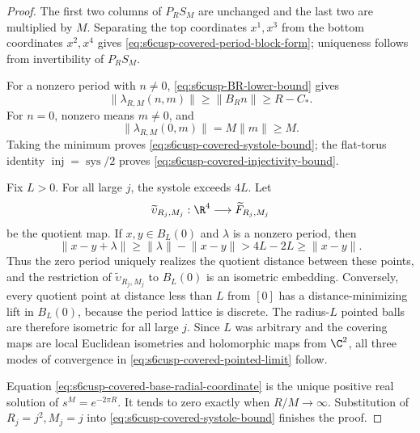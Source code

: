 \begin{proof}
The first two columns of \(P_RS_M\) are unchanged and the last two are
multiplied by \(M\).  Separating the top coordinates \(x^1,x^3\) from the
bottom coordinates \(x^2,x^4\) gives
\eqref{eq:s6cusp-covered-period-block-form}; uniqueness follows from
invertibility of \(P_RS_M\).

For a nonzero period with \(n\ne0\),
\eqref{eq:s6cusp-BR-lower-bound} gives
\[
 \lVert\lambda_{R,M}(n,m)\rVert
 \ge\lVert B_Rn\rVert
 \ge R-C_*.
\]
For \(n=0\), nonzero means \(m\ne0\), and
\[
 \lVert\lambda_{R,M}(0,m)\rVert=M\lVert m\rVert\ge M.
\]
Taking the minimum proves \eqref{eq:s6cusp-covered-systole-bound}; the
flat-torus identity
\(\operatorname{inj}=\operatorname{sys}/2\) proves
\eqref{eq:s6cusp-covered-injectivity-bound}.

Fix \(L>0\).  For all large \(j\), the systole exceeds \(4L\).  Let
\[
 \widetilde\upsilon_{R_j,M_j}:
 \R^4\longrightarrow\widetilde F_{R_j,M_j}
\]
be the quotient map.  If \(x,y\in B_L(0)\) and \(\lambda\) is a nonzero
period, then
\[
 \lVert x-y+\lambda\rVert
 \ge\lVert\lambda\rVert-\lVert x-y\rVert
 >4L-2L\ge\lVert x-y\rVert.
\]
Thus the zero period uniquely realizes the quotient distance between these
points, and the restriction of \(\widetilde\upsilon_{R_j,M_j}\) to
\(B_L(0)\) is an isometric embedding.  Conversely, every quotient point
at distance less than \(L\) from \([0]\) has a distance-minimizing lift in
\(B_L(0)\), because the period lattice is discrete.  The radius-\(L\)
pointed balls are therefore isometric for all large \(j\).  Since \(L\)
was arbitrary and the covering maps are local Euclidean isometries and
holomorphic maps from \(\C^2\), all three modes of convergence in
\eqref{eq:s6cusp-covered-pointed-limit} follow.

Equation \eqref{eq:s6cusp-covered-base-radial-coordinate} is the unique
positive real solution of \(s^M=e^{-2\pi R}\).  It tends to zero exactly
when \(R/M\to\infty\).  Substitution of \(R_j=j^2,M_j=j\) into
\eqref{eq:s6cusp-covered-systole-bound} finishes the proof.
\end{proof}

